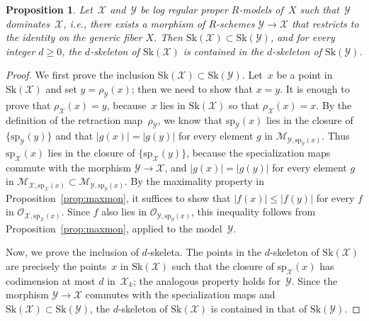 \documentclass[11pt]{article}
\let\mathcal\mathscr
\newtheorem{prop}[equation]{Proposition}
\theoremstyle{definition}
\numberwithin{equation}{subsection}
\newcommand{\cX}{\ensuremath{\mathscr{X}}}
\newcommand{\cY}{\ensuremath{\mathscr{Y}}}
\newcommand{\Sk}{\mathrm{Sk}}
\newcommand{\spe}{\mathrm{sp}}
\begin{document}
\begin{prop}\label{prop:compat1}
Let~$\cX$ and~$\cY$ be log regular proper $R$\nobreakdash-models of~$X$ such that~$\cY$ dominates~$\cX$, {\em i.e.}, there exists a morphism of $R$\nobreakdash-schemes $\cY\to \cX$ that restricts to the identity on the generic fiber $X$. Then $\Sk(\cX)\!\subset\!\Sk(\cY)$, and for every integer $d\!\geq\!0$, the $d$\nobreakdash-skeleton of $\Sk(\cX)$ is contained in the $d$\nobreakdash-skeleton of $\Sk(\cY)$.
\end{prop}
\begin{proof}
We first prove the inclusion $\Sk(\cX)\subset \Sk(\cY)$.
Let~$x$ be a point in $\Sk(\cX)$ and
set $y=\rho_{\cY}(x)$; then we need to show that $x=y$. It is enough to prove that $\rho_{\cX}(x)=y$, because~$x$ lies in $\Sk(\cX)$ so that $\rho_{\cX}(x)=x$.
By the definition of the retraction map~$\rho_{\cY}$, we know that $\spe_{\cY}(x)$ lies in the closure of $\{\spe_{\cY}(y)\}$
and that $|g(x)|=|g(y)|$ for every element $g$ in $\mathcal{M}_{\cY,\spe_{\cY}(x)}$.
Thus $\spe_{\cX}(x)$ lies in the closure of $\{\spe_{\cX}(y)\}$, because the specialization maps commute with the morphism \hbox{$\cY\to \cX$}, and
$|g(x)|=|g(y)|$ for every element $g$ in $\mathcal{M}_{\cX,\spe_{\cX}(x)}\subset \mathcal{M}_{\cY,\spe_{\cY}(x)}$.
By the maximality property in Proposition~\ref{prop:maxmon}, it suffices to show that $|f(x)|\leq |f(y)|$ for every $f$ in $\mathcal{O}_{\cX,\spe_{\cX}(x)}$.
Since $f$ also lies in $\mathcal{O}_{\cY,\spe_{\cY}(x)}$, this inequality follows from Proposition~\ref{prop:maxmon}, applied to the model~$\cY$.

Now, we prove the inclusion of $d$\nobreakdash-skeleta.
The points in the $d$\nobreakdash-skeleton of $\Sk(\cX)$ are precisely the points~$x$ in $\Sk(\cX)$ such that the closure of $\spe_{\cX}(x)$ has codimension at most $d$ in~$\cX_k$; the analogous property holds for~$\cY$.
Since the morphism $\cY\to \cX$ commutes with the specialization maps and $\Sk(\cX)\subset \Sk(\cY)$, the $d$\nobreakdash-skeleton of $\Sk(\cX)$ is contained in that of $\Sk(\cY)$.
\end{proof}
\end{document}
